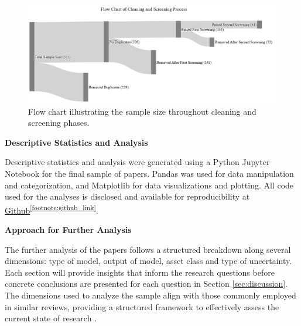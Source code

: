   \begin{figure}[h]
      \centering
      \includegraphics[width=1\linewidth]{Images/screening_funnel.png}
      \caption{Flow chart illustrating the sample size throughout cleaning and screening phases.}
      \label{fig:screening_and_cleaning_funnel}
  \end{figure}


\textbf{Descriptive Statistics and Analysis}\nopagebreak

Descriptive statistics and analysis were generated using a Python Jupyter Notebook for the final sample of papers. Pandas was used for data manipulation and categorization, and Matplotlib for data visualizations and plotting. All code used for the analyses is disclosed and available for reproducibility at \hyperlink{https://github.com/tjespe/literature-review/}{Github}\textsuperscript{\ref{footnote:github_link}}.

\textbf{Approach for Further Analysis}\nopagebreak

The further analysis of the papers follows a structured breakdown along several dimensions: type of model, output of model, asset class and type of uncertainty. Each section will provide insights that inform the research questions before concrete conclusions are presented for each question in Section \ref{sec:discussion}. The dimensions used to analyze the sample align with those commonly employed in similar reviews, providing a structured framework to effectively assess the current state of research \parencite{Blasco_et_al_2024}.

